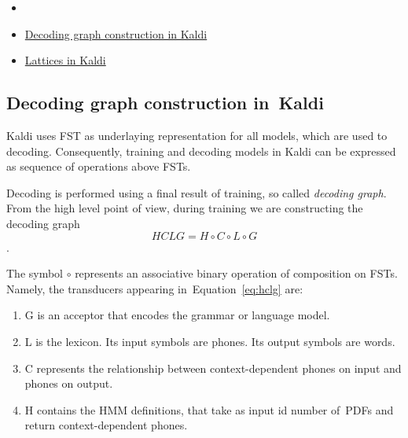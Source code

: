 \begin{itemize}
    \item {}
    \item \href{http://kaldi.sourceforge.net/graph.html} {Decoding graph construction in Kaldi}
    \item \href{http://kaldi.sourceforge.net/lattices.html} {Lattices in Kaldi}
\end{itemize}

\subsection{Decoding graph construction in~Kaldi} %
Kaldi uses \ac{FST} as underlaying representation for all models, which are used to decoding. Consequently, 
training and decoding models in Kaldi can be expressed as sequence of operations above \acp{FST}.

Decoding is performed using a final result of training, so called {\it decoding graph}. 
From the high level point of view,
during training we are constructing the decoding graph 
\begin{equation} \label{eq:hclg}
HCLG = H\circ C\circ L\circ G
\end{equation}.

The symbol $\circ$ represents an associative binary operation of composition on \acp{FST}.
Namely, the transducers appearing in~Equation~\ref{eq:hclg} are:
\begin{enumerate}
    \item G is an acceptor that encodes the grammar or language model.
    \item L is the lexicon. Its input symbols are phones. Its output symbols are words.
    \item C represents the relationship between context-dependent phones on input and phones on output.
    \item H contains the \ac{HMM} definitions, that take as input id number of~\acp{PDF} and return context-dependent phones.
\end{enumerate}

